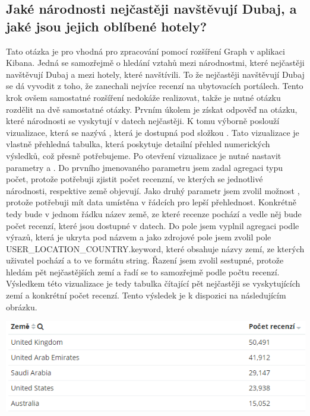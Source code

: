 \documentclass[czech,BP]{thesiskiv}
\begin{document}
\subsection{Jaké národnosti nejčastěji navštěvují Dubaj, a jaké jsou jejich oblíbené hotely?}
Tato otázka je pro vhodná pro zpracování pomocí rozšíření Graph v aplikaci Kibana. Jedná se samozřejmě o hledání vztahů mezi národnostmi, které nejčastěji navštěvují Dubaj a mezi hotely, které navštívili. To že nejčastěji navštěvují Dubaj se dá vyvodit z toho, že zanechali nejvíce recenzí na ubytovacích portálech. Tento krok ovšem samostatné rozšíření nedokáže realizovat, takže je nutné otázku rozdělit na dvě samostatné otázky.
Prvním úkolem je získat odpověď na otázku, které národnosti se vyskytují v datech nejčastěji. K tomu výborně poslouží vizualizace, která se nazývá , která je dostupná pod složkou . Tato vizualizace je vlastně přehledná tabulka, která poskytuje detailní přehled numerických výsledků, což přesně potřebujeme. Po otevření vizualizace je nutné nastavit parametry  a . Do prvního jmenovaného parametru jsem zadal agregaci typu počet, protože potřebuji zjistit počet recenzní, ve kterých se jednotlivé národnosti, respektive země objevují. Jako druhý parametr jsem zvolil možnost , protože potřebuji mít data umístěna v řádcích pro lepší přehlednost. Konkrétně tedy bude v jednom řádku název země, ze které recenze pochází a vedle něj bude počet recenzí, které jsou dostupné v datech. Do pole  jsem vyplnil agregaci podle výrazů, která je ukryta pod názvem  a jako zdrojové pole jsem zvolil pole USER\_LOCATION\_COUNTRY.keyword, které obsahuje názvy zemí, ze kterých uživatel pochází a to ve formátu string. Řazení jsem zvolil sestupné, protože hledám pět nejčastějších zemí a řadí se to samozřejmě podle počtu recenzí. Výsledkem této vizualizace je tedy tabulka čítající pět nejčastěji se vyskytujících zemí a konkrétní počet recenzí. Tento výsledek je k dispozici na následujícím obrázku.
\begin{center}
\includegraphics[width = \textwidth]{img/5_countries_highest_table.png}
\end{center}
\end{document}
